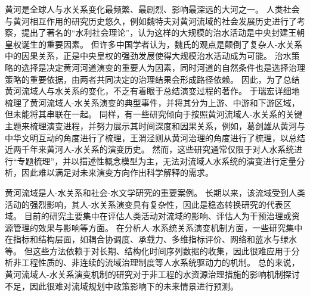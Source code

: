 
黄河是全球人与水关系变化最频繁、最剧烈、影响最深远的大河之一。
人类社会与黄河相互作用的研究历史悠久，例如魏特夫对黄河流域的社会发展历史进行了考察，提出了著名的“水利社会理论”，认为这样的大规模的治水活动是中央封建王朝皇权诞生的重要因素\cite{weitefu1989}。
但许多中国学者认为，魏氏的观点是颠倒了复杂人-水关系中的因果关系，正是中央皇权的强劲发展使得大规模治水活动成为可能\cite{jizhaoding1981}。
治水策略的选择是决定黄河河道演变的重要人为因素，同时河道的自然条件也是选择治理策略的重要依据，由两者共同决定的治理结果会形成路径依赖\cite{WangWeiJing2009}。
因此，为了总结黄河流域人与水关系的变化，不乏有着眼于总结演变过程的著作。
于瑞宏详细地梳理了黄河流域人-水关系演变的典型事件，并将其分为上游、中游和下游区域，但未能将其串联在一起\cite{yuruihong2011}。
同样，有一些研究倾向于按照黄河流域人-水关系的关键主题来梳理演变进程，并努力展示其时间深度和因果关系，例如，葛剑雄从黄河与中华文明互动的角度进行了梳理\cite{gejianxiong2020}，王渭泾则从黄河治理的角度进行了梳理\cite{WangWeiJing2009}，以总结近两千年来黄河人-水关系的演变历史。
然而，这些研究通常仅限于对人水系统进行“专题梳理”，并以描述性概念模型为主，无法对流域人水系统的演变进行定量分析，因此难以满足对未来演变方向作出科学解释的需求。

黄河流域是人-水关系和社会-水文学研究的重要案例。
长期以来，该流域受到人类活动的强烈影响，其人-水关系演变具有复杂性，因此是稳态转换研究的代表区域\cite{zuo2022, wang2014}。
目前的研究主要集中在评估人类活动对流域的影响、评估人为干预治理或资源管理的效果与影响等方面\cite{wang2016a, WuXuTong2021, wang2019c}。
在分析人-水系统关系演变机制方面，一些研究集中在指标和结构层面，如耦合协调度\cite{libo2022}、承载力\cite{wang2022d}、多维指标评价\cite{li2020}、网络\cite{song2022}和蓝水与绿水等\cite{zhuo2016a}。
但这些方法依赖于对长期、结构化时间序列数据的收集，因此很难应用于分析非工程性质的、非连续的流域治理制度等人水系统驱动力的机制。
总的来说，黄河流域人-水关系演变机制的研究对于非工程的水资源治理措施的影响机制探讨不足，因此很难对流域规划中政策影响下的未来情景进行预测。

